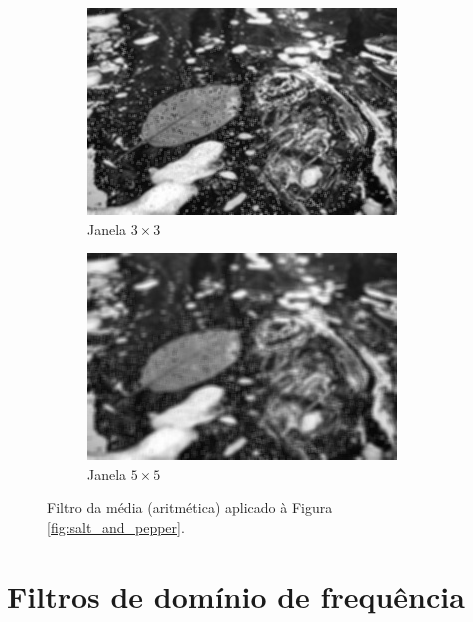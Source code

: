 \documentclass[10pt,a4paper]{article}
\begin{document}
\begin{figure}[!ht]
    \centering
    \begin{subfigure}[ht]{0.45\textwidth}
        \includegraphics[width=\textwidth]{dst_sp_avg3.jpg}
        \caption{Janela $3 \times 3$}
        \label{fig:avg_filter3}
    \end{subfigure}
    \qquad
    \begin{subfigure}[ht]{0.45\textwidth}
        \includegraphics[width=\textwidth]{dst_sp_avg5.jpg}
        \caption{Janela $5 \times 5$}
        \label{fig:avg_filter5}
    \end{subfigure}
    \caption{Filtro da média (aritmética) aplicado à Figura \ref{fig:salt_and_pepper}.}
\end{figure}

\newpage

\section{Filtros de domínio de frequência}
\end{document}
